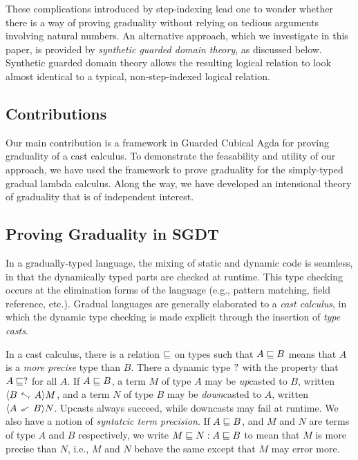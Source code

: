 \documentclass[acmsmall,screen]{acmart}
\begin{document}
  These complications introduced by step-indexing lead one to wonder whether there is a
  way of proving graduality without relying on tedious arguments involving natural numbers.
  An alternative approach, which we investigate in this paper, is provided by
  \emph{synthetic guarded domain theory}, as discussed below.
  Synthetic guarded domain theory allows the resulting logical relation to look almost
  identical to a typical, non-step-indexed logical relation.

  \subsection{Contributions}
  Our main contribution is a framework in Guarded Cubical Agda for proving graduality of a cast calculus.
  To demonstrate the feasability and utility of our approach, we have used the framework to prove
  graduality for the simply-typed gradual lambda calculus. Along the way, we have developed an intensional theory
  of graduality that is of independent interest.


  \subsection{Proving Graduality in SGDT}

  In a gradually-typed language, the mixing of static and dynamic code is seamless, in that
  the dynamically typed parts are checked at runtime. This type checking occurs at the elimination
  forms of the language (e.g., pattern matching, field reference, etc.).
  Gradual languages are generally elaborated to a \emph{cast calculus}, in which the dynamic
  type checking is made explicit through the insertion of \emph{type casts}.

  In a cast calculus, there is a relation $\sqsubseteq$ on types such that $A \sqsubseteq B$ means that
  $A$ is a \emph{more precise} type than $B$.
  There a dynamic type $?$ with the property that $A \sqsubseteq ?$ for all $A$.
  If $A \sqsubseteq B$, a term $M$ of type $A$ may be \emph{up}casted to $B$, written $\up A B M$,
  and a term $N$ of type $B$ may be \emph{down}casted to $A$, written $\dn A B N$.
  Upcasts always succeed, while downcasts may fail at runtime.
  We also have a notion of \emph{syntatcic term precision}.
  If $A \sqsubseteq B$, and $M$ and $N$ are terms of type $A$ and $B$ respectively, we write
  $M \sqsubseteq N : A \sqsubseteq B$ to mean that $M$ is more precise than $N$, i.e., $M$ and $N$
  behave the same except that $M$ may error more.
\end{document}
